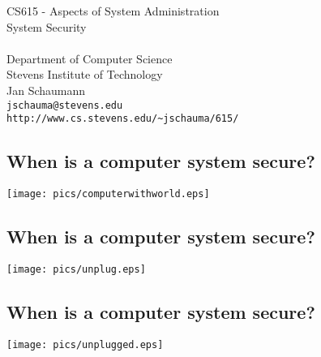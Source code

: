 \documentclass[xga]{xdvislides}
\begin{document}
\setfontphv

\lhead{\slidetitle}                               %
\cfoot{\relax}                               %
\rfoot{\Gray{\today}}
\vspace*{\fill}
\begin{center}
	\Hugesize
		CS615 - Aspects of System Administration\\ [1em]
		System Security\\ [1em]
	\hspace*{5mm}\blueline\\ [1em]
	\Normalsize
		Department of Computer Science\\
		Stevens Institute of Technology\\
		Jan Schaumann\\
		\verb+jschauma@stevens.edu+ \\
		\verb+http://www.cs.stevens.edu/~jschauma/615/+
\end{center}
\vspace*{\fill}

\subsection{When is a computer system secure?}
\vspace*{\fill}
\begin{center}
	\texttt{[image: pics/computerwithworld.eps]}
\end{center}
\vspace*{\fill}

\subsection{When is a computer system secure?}
\vspace*{\fill}
\begin{center}
	\texttt{[image: pics/unplug.eps]}
\end{center}
\vspace*{\fill}

\subsection{When is a computer system secure?}
\vspace*{\fill}
\begin{center}
	\texttt{[image: pics/unplugged.eps]}
\end{center}
\vspace*{\fill}
\end{document}
